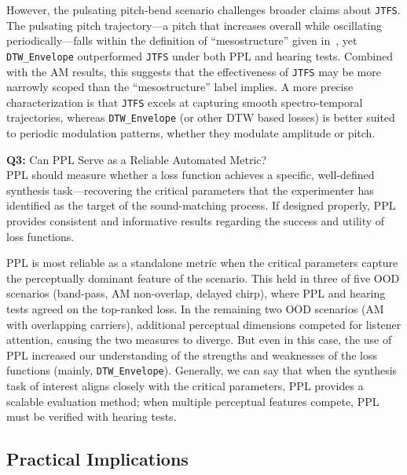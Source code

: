 \documentclass[10pt]{article} %
\newcommand{\JTFS}{\texttt{JTFS}\xspace}
\newcommand{\DTWEnv}{\texttt{DTW\_\allowbreak Envelope}\xspace}
\begin{document}
However, the pulsating pitch-bend scenario challenges broader claims about \JTFS{}. The pulsating pitch trajectory---a pitch that increases overall while oscillating periodically---falls within the definition of ``mesostructure'' given in~\cite{vahidi2023mesostructures}, yet \DTWEnv{} outperformed \JTFS{} under both PPL and hearing tests. Combined with the AM results, this suggests that the effectiveness of \JTFS{} may be more narrowly scoped than the ``mesostructure'' label implies. A more precise characterization is that \JTFS{} excels at capturing smooth spectro-temporal trajectories, whereas \DTWEnv{} (or other DTW based losses) is better suited to periodic modulation patterns, whether they modulate amplitude or pitch.

\textbf{Q3:} Can PPL Serve as a Reliable Automated Metric?\\
PPL should measure whether a loss function achieves a specific, well-defined synthesis task---recovering the critical parameters that the experimenter has identified as the target of the sound-matching process. If designed properly, PPL provides consistent and informative results regarding the success and utility of loss functions.

PPL is most reliable as a standalone metric when the critical parameters capture the perceptually dominant feature of the scenario. This held in three of five OOD scenarios (band-pass, AM non-overlap, delayed chirp), where PPL and hearing tests agreed on the top-ranked loss. In the remaining two OOD scenarios (AM with overlapping carriers), additional perceptual dimensions competed for listener attention, causing the two measures to diverge. But even in this case, the use of PPL increased our understanding of the strengths and weaknesses of the loss functions (mainly, \DTWEnv). Generally, we can say that when the synthesis task of interest aligns closely with the critical parameters, PPL provides a scalable evaluation method; when multiple perceptual features compete, PPL must be verified with hearing tests.


\subsection{Practical Implications}
\end{document}
